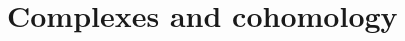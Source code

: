 \documentclass[../../../main]{subfiles}
\begin{document}
\chapter{Complexes and cohomology}




\end{document}
